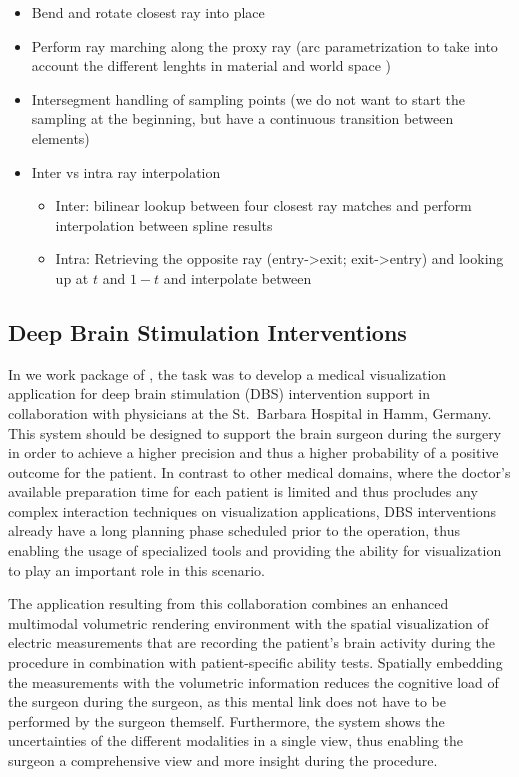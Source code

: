 \begin{itemize}
\begin{itemize}
    \item Bend and rotate closest ray into place
    \item Perform ray marching along the proxy ray (arc parametrization to take into account the different lenghts in material and world space \cite{guenter90arclength})
    \item Intersegment handling of sampling points (we do not want to start the sampling at the beginning, but have a continuous transition between elements)
    \item Inter vs intra ray interpolation
    \begin{itemize}
        \item Inter: bilinear lookup between four closest ray matches and perform interpolation between spline results
        \item Intra: Retrieving the opposite ray (entry->exit; exit->entry) and looking up at $t$ and $1-t$ and interpolate between
    \end{itemize}
\end{itemize}

\end{itemize}

\subsection{Deep Brain Stimulation Interventions}
\label{contributions:medbio:dbs}
In we work package of , the task was to develop a medical visualization application for deep brain stimulation (DBS) intervention support in collaboration with physicians at the St.~Barbara Hospital in Hamm, Germany. This system should be designed to support the brain surgeon during the surgery in order to achieve a higher precision and thus a higher probability of a positive outcome for the patient. In contrast to other medical domains, where the doctor's available preparation time for each patient is limited and thus procludes any complex interaction techniques on visualization applications, DBS interventions already have a long planning phase scheduled prior to the operation, thus enabling the usage of specialized tools and providing the ability for visualization to play an important role in this scenario.

The application resulting from this collaboration combines an enhanced multimodal  volumetric rendering environment with the spatial visualization of electric measurements that are recording the patient's brain activity during the procedure in combination with patient-specific ability tests. Spatially embedding the measurements with the volumetric information reduces the cognitive load of the surgeon during the surgeon, as this mental link does not have to be performed by the surgeon themself. Furthermore, the system shows the uncertainties of the different modalities in a single view, thus enabling the surgeon a comprehensive view and  more insight during the procedure.

